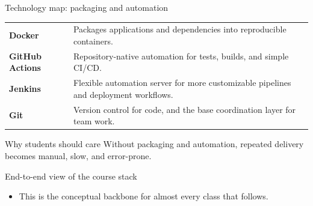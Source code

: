 \begin{frame}{Technology map: packaging and automation}
\begin{tabularx}{\textwidth}{>{\bfseries}l X}
Docker & Packages applications and dependencies into reproducible containers. \\
GitHub Actions & Repository-native automation for tests, builds, and simple CI/CD. \\
Jenkins & Flexible automation server for more customizable pipelines and deployment workflows. \\
Git & Version control for code, and the base coordination layer for team work. \\
\end{tabularx}
\begin{block}{Why students should care}
Without packaging and automation, repeated delivery becomes manual, slow, and error-prone.
\end{block}
\coursefooter
\end{frame}

\begin{frame}{End-to-end view of the course stack}
\centering
{}
\vspace{0.6em}
\begin{itemize}
\item This is the conceptual backbone for almost every class that follows.
\end{itemize}
\coursefooter
\end{frame}

